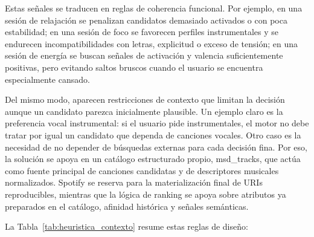 Estas señales se traducen en reglas de coherencia funcional. Por ejemplo, en una
sesión de relajación se penalizan candidatos demasiado activados o con
poca estabilidad; en una sesión de foco se favorecen perfiles
instrumentales y se endurecen incompatibilidades con letras, explicitud o
exceso de tensión; en una sesión de energía se buscan señales de
activación y valencia suficientemente positivas, pero evitando saltos bruscos
cuando el usuario se encuentra especialmente cansado.

Del mismo modo, aparecen restricciones de contexto que limitan la decisión
aunque un candidato parezca inicialmente plausible. Un ejemplo claro es la
preferencia vocal instrumental: si el usuario pide instrumentales, el motor no
debe tratar por igual un candidato que dependa de canciones vocales. Otro caso
es la necesidad de no depender de búsquedas externas para cada decisión fina.
Por eso, la solución se apoya en un catálogo estructurado propio,
msd\_tracks, que actúa como fuente principal de canciones candidatas y
de descriptores musicales normalizados. Spotify se reserva para la
materialización final de URIs reproducibles, mientras que la lógica de ranking
se apoya sobre atributos ya preparados en el catálogo, afinidad histórica y
señales semánticas.

La Tabla~\ref{tab:heuristica_contexto} resume estas reglas de diseño:

